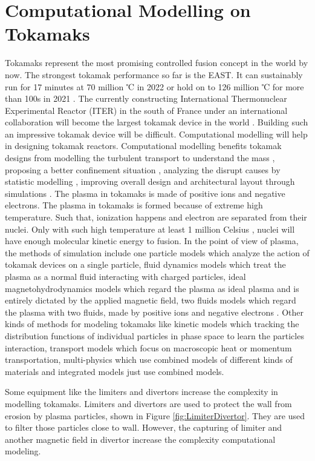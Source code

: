 \section{Computational Modelling on Tokamaks}
\label{section1.3}
Tokamaks represent the most promising controlled fusion concept in the world by now. The strongest tokamak performance so far is the EAST. It can sustainably run for 17 minutes at 70 million ℃ in 2022 \cite{moynihan2023fusion,gong2024overview} or hold on to 126 million ℃ for more than 100s in 2021 \cite{CAS2021}. The currently constructing International Thermonuclear Experimental Reactor (ITER) in the south of France under an international collaboration will become the largest tokamak device in the world \cite{moynihan2023fusion}. Building such an impressive tokamak device will be difficult. Computational modelling will help in designing tokamak reactors. Computational modelling benefits tokamak designs from modelling the turbulent transport to understand the mass \cite{zanisi2024efficient}, proposing a better confinement situation \cite{ding2024high}, analyzing the disrupt causes by statistic modelling \cite{de2011survey}, improving overall design and architectural layout through simulations \cite{federici2016overview}. The plasma in tokamaks is made of positive ions and negative electrons. The plasma in tokamaks is formed because of extreme high temperature. Such that, ionization happens and electron are separated from their nuclei. Only with such high temperature at least 1 million Celsius \cite{li2021experimental}, nuclei will have enough molecular kinetic energy to fusion. In the point of view of plasma, the methods of simulation include one particle models which analyze the action of tokamak devices on a single particle, fluid dynamics models which treat the plasma as a normal fluid interacting with charged particles, ideal magnetohydrodynamics models which regard the plasma as ideal plasma and is entirely dictated by the applied magnetic field, two fluids models which regard the plasma with two fluids,  made by positive ions and negative electrons \cite{ongena2016magnetic,moynihan2023fusion}. Other kinds of methods for modeling tokamaks like kinetic models which tracking the distribution functions of individual particles in phase space to learn the particles interaction, transport models which focus on macroscopic heat or momentum transportation, multi-physics which use combined models of different kinds of materials and integrated models just use combined models. 

Some equipment like the limiters and divertors increase the complexity in modelling tokamaks. Limiters and divertors are used to protect the wall from erosion by plasma particles, shown in Figure \ref{fig:LimiterDivertor}. They are used to filter those particles close to wall. However, the capturing of limiter and another magnetic field in divertor increase the complexity computational modeling. 
